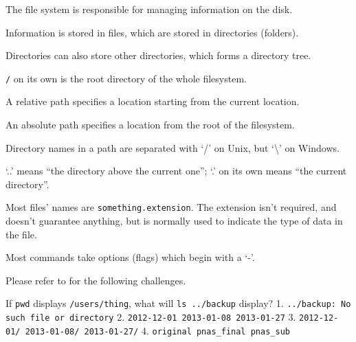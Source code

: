 \begin{keypoints}
\begin{swcitemize}
\item
  The file system is responsible for managing information on the disk.
\item
  Information is stored in files, which are stored in directories
  (folders).
\item
  Directories can also store other directories, which forms a directory
  tree.
\item
  \texttt{/} on its own is the root directory of the whole filesystem.
\item
  A relative path specifies a location starting from the current
  location.
\item
  An absolute path specifies a location from the root of the filesystem.
\item
  Directory names in a path are separated with `/' on Unix, but
  `\textbackslash{}' on Windows.
\item
  `..' means ``the directory above the current one''; `.' on its own
  means ``the current directory''.
\item
  Most files' names are \texttt{something.extension}. The extension
  isn't required, and doesn't guarantee anything, but is normally used
  to indicate the type of data in the file.
\item
  Most commands take options (flags) which begin with a `-'.
\end{swcitemize}
\end{keypoints}

Please refer to  for the following challenges.


\begin{challenge}

  If \texttt{pwd} displays \texttt{/users/thing}, what will
  \texttt{ls ../backup} display? 1.
  \texttt{../backup: No such file or directory} 2.
  \texttt{2012-12-01 2013-01-08 2013-01-27} 3.
  \texttt{2012-12-01/ 2013-01-08/ 2013-01-27/} 4.
  \texttt{original pnas\_final pnas\_sub}

\end{challenge}

